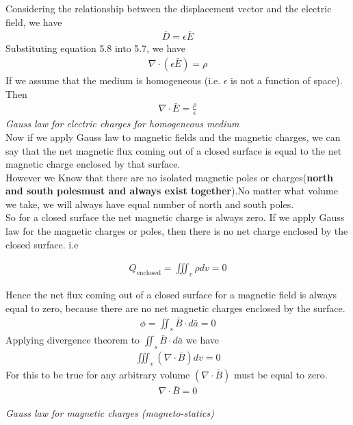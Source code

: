 Considering the relationship between the displacement vector and the electric field, we have 
\begin{align}
\boxed{\bar{D} = \epsilon\bar{E}}
\end{align}
Substituting equation 5.8 into 5.7, we have
\begin{align*}
\nabla \cdot (\epsilon\bar{E}) = \rho
\end{align*}
If we assume that the medium is homogeneous (i.e. $\epsilon$ is not a function of space). Then
\begin{align} 
\boxed{\nabla \cdot \bar{E} = \frac{\rho}{\epsilon}}
\end{align} 
\emph{Gauss law for electric charges for homogeneous medium}\\

Now if we apply Gauss law to magnetic fields and the magnetic charges, we can say that the net magnetic flux coming out of a closed surface is equal to the net magnetic charge enclosed by that surface.\\


However we Know that there are no isolated magnetic poles or charges(\textbf{north and south polesmust and always exist together}).No matter what volume we take, we will always have equal number of north and south poles.\\
So for a closed surface the net magnetic charge is always zero. If we apply Gauss law for the magnetic charges or poles, then there is no net charge enclosed by the closed surface. i.e

\begin{align*}
Q_{\text{enclosed}} = \iiint_v\rho dv = 0
\end{align*}

Hence the net flux coming out of a closed surface for a magnetic field is always equal to zero, because there are no net magnetic charges enclosed by the surface.
\begin{align*}
\phi = \iint_s\bar{B}\cdot d\bar{a} = 0
\end{align*}
Applying divergence theorem to $\iint_s\bar{B}\cdot d\bar{a}$ we have
\begin{align*}
\iiint_v(\nabla \cdot \bar{B})dv = 0
\end{align*}	
For this to be true for any arbitrary volume $(\nabla \cdot \bar{B})$ must be equal to zero.
\begin{align}
\boxed{\nabla \cdot \bar{B} = 0}
\end{align}
\begin{center}
\emph{Gauss law for magnetic charges (magneto-statics)}
\end{center}




